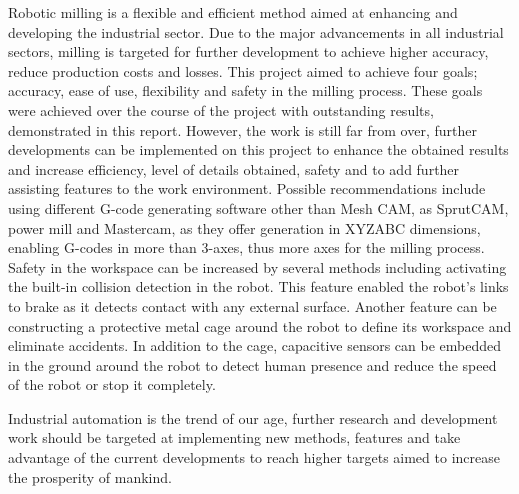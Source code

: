 
Robotic milling is a flexible and efficient method aimed at enhancing and developing the industrial sector. Due to the major advancements in all industrial sectors, milling is targeted for further development to achieve higher accuracy, reduce production costs and losses. This project aimed to achieve four goals; accuracy, ease of use, flexibility and safety in the milling process. These goals were achieved over the course of the project with outstanding results, demonstrated in this report. 
\medskip			
However, the work is still far from over, further developments can be implemented on this project to enhance the obtained results and increase efficiency, level of details obtained, safety and to add further assisting features to the work environment. 
Possible recommendations include using different G-code generating software other than Mesh CAM, as SprutCAM, power mill and Mastercam, as they offer generation in XYZABC dimensions, enabling G-codes in more than 3-axes, thus more axes for the milling process. Safety in the workspace can be increased by several methods including activating the built-in collision detection in the robot. This feature enabled the robot’s links to brake as it detects contact with any external surface. Another feature can be constructing a protective metal cage around the robot to define its workspace and eliminate accidents. In addition to the cage, capacitive sensors can be embedded in the ground around the robot to detect human presence and reduce the speed of the robot or stop it completely.


\medskip Industrial automation is the trend of our age, further research and development work should be targeted at implementing new methods, features and take advantage of the current developments to reach higher targets aimed to increase the prosperity of mankind.



